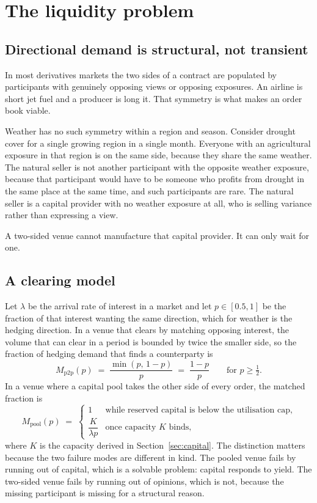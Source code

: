 \documentclass[11pt,a4paper]{article}
\begin{document}
\section{The liquidity problem}
\label{sec:liquidity}

\subsection{Directional demand is structural, not transient}

In most derivatives markets the two sides of a contract are populated by participants with
genuinely opposing views or opposing exposures. An airline is short jet fuel and a producer
is long it. That symmetry is what makes an order book viable.

Weather has no such symmetry within a region and season. Consider drought cover for a single
growing region in a single month. Everyone with an agricultural exposure in that region is
on the same side, because they share the same weather. The natural seller is not another
participant with the opposite weather exposure, because that participant would have to be
someone who profits from drought in the same place at the same time, and such participants
are rare. The natural seller is a capital provider with no weather exposure at all, who is
selling variance rather than expressing a view.

A two-sided venue cannot manufacture that capital provider. It can only wait for one.

\subsection{A clearing model}

Let $\lambda$ be the arrival rate of interest in a market and let $p \in [0.5, 1]$ be the
fraction of that interest wanting the same direction, which for weather is the hedging
direction. In a venue that clears by matching opposing interest, the volume that can clear
in a period is bounded by twice the smaller side, so the fraction of hedging demand that
finds a counterparty is
\[
  M_{\mathrm{p2p}}(p) \;=\; \frac{\min(p,\,1-p)}{p} \;=\; \frac{1-p}{p}
  \qquad \text{for } p \ge \tfrac{1}{2}.
\]
In a venue where a capital pool takes the other side of every order, the matched fraction is
\[
  M_{\mathrm{pool}}(p) \;=\;
  \begin{cases}
    1 & \text{while reserved capital is below the utilisation cap,}\\[2pt]
    \dfrac{K}{\lambda p} & \text{once capacity } K \text{ binds,}
  \end{cases}
\]
where $K$ is the capacity derived in Section~\ref{sec:capital}. The distinction matters
because the two failure modes are different in kind. The pooled venue fails by running out
of capital, which is a solvable problem: capital responds to yield. The two-sided venue
fails by running out of opinions, which is not, because the missing participant is missing
for a structural reason.
\end{document}
